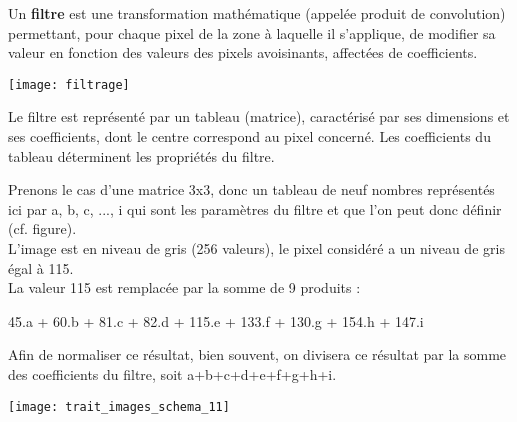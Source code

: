 Un \textbf{filtre} est une transformation mathématique (appelée produit de convolution)
permettant, pour chaque pixel de la zone à laquelle il s'applique,
de modifier sa valeur en fonction des valeurs des pixels avoisinants,
affectées de coefficients.\\
\begin{center}
\texttt{[image: filtrage]}
\end{center}

Le filtre est représenté par un tableau (matrice), caractérisé par
ses dimensions et ses coefficients, dont le centre correspond au pixel 
concerné. Les coefficients du tableau déterminent les propriétés du filtre.


\begin{exemple}
Prenons le cas d'une matrice 3x3, donc un tableau de neuf nombres
représentés
ici par a, b, c, ..., i qui sont les paramètres du filtre et que l'on
peut donc définir (cf. figure).
~~\\

L'image est en niveau de gris (256 valeurs), le pixel considéré a un niveau de gris
égal à 115.
~~\\

La valeur 115 est remplacée par la somme de 9 produits : 

45.a + 60.b + 81.c + 82.d + 115.e + 133.f + 130.g + 154.h + 147.i

Afin de normaliser ce résultat, bien souvent, on divisera ce résultat
par la somme des coefficients du filtre, soit a+b+c+d+e+f+g+h+i.
\end{exemple}

\begin{center}
{\texttt{[image: trait\_images\_schema\_11]}}
\end{center}

